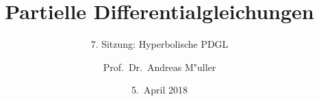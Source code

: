 %
%
%
\usepackage[utf8]{inputenc}
\usepackage[T1]{fontenc}
\usepackage{epic}
\usepackage{color}
\usepackage{array}
\usepackage{ifthen}
\usepackage{tikz}
\usepackage{german}
\usetikzlibrary{shapes.geometric,decorations.pathmorphing}
\beamertemplatenavigationsymbolsempty
\title[]{Partielle Differentialgleichungen}
\subtitle{7. Sitzung: Hyperbolische PDGL}
\date[5.~April 2018]{5.~April 2018}
\author{Prof.~Dr.~Andreas M"uller}

